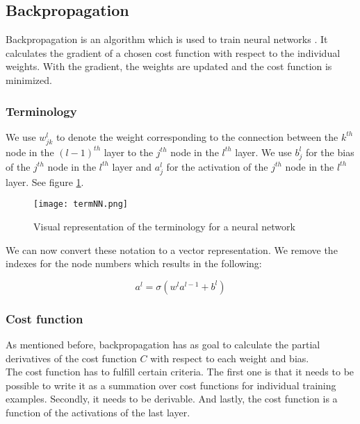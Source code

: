 	\subsection{Backpropagation}
	
Backpropagation is an algorithm which is used to train neural networks \cite{bp:article}. It calculates the gradient of a chosen cost function with respect to the individual weights. With the gradient, the weights are updated and the cost function is minimized.

		\subsubsection{Terminology}
		
We use $w^l_{jk}$ to denote the weight corresponding to the connection between the $k^{th}$ node in the $(l-1)^{th}$ layer to the $j^{th}$ node in the $l^{th}$ layer. We use $b^l_j$ for the bias of the $j^{th}$ node in the $l^{th}$ layer and $a^l_j$ for the activation of the $j^{th}$ node in the $l^{th}$ layer. See figure \ref{fig:termNN}.

\begin{figure}[H]
	\centering
	\texttt{[image: termNN.png]}
	\caption{Visual representation of the terminology for a neural network \cite{NNintro:online}}
	\label{fig:termNN}
\end{figure} 

We can now convert these notation to a vector representation. We remove the indexes for the node numbers which results in the following:

\begin{equation} 
a^l = \sigma (w^la^{l-1}+b^l)
\end{equation}

		\subsubsection{Cost function}
		
As mentioned before, backpropagation has as goal to calculate the partial derivatives of the cost function $C$ with respect to each weight and bias. \\
The cost function has to fulfill certain criteria. The first one is that it needs to be possible to write it as a summation over cost functions for individual training examples. Secondly, it needs to be derivable. And lastly, the cost function is a function of the activations of the last layer. 


